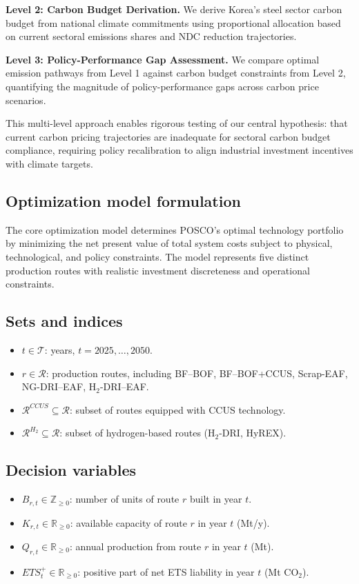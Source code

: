 \documentclass[preprint,5p,authoryear]{elsarticle}
\begin{document}
\textbf{Level 2: Carbon Budget Derivation.} We derive Korea's steel sector carbon budget from national climate commitments using proportional allocation based on current sectoral emissions shares and NDC reduction trajectories.

\textbf{Level 3: Policy-Performance Gap Assessment.} We compare optimal emission pathways from Level 1 against carbon budget constraints from Level 2, quantifying the magnitude of policy-performance gaps across carbon price scenarios.

This multi-level approach enables rigorous testing of our central hypothesis: that current carbon pricing trajectories are inadequate for sectoral carbon budget compliance, requiring policy recalibration to align industrial investment incentives with climate targets.

\subsection{Optimization model formulation}

The core optimization model determines POSCO's optimal technology portfolio by minimizing the net present value of total system costs subject to physical, technological, and policy constraints. The model represents five distinct production routes with realistic investment discreteness and operational constraints.

\subsection{Sets and indices}
\begin{itemize}[leftmargin=*]
    \item $t \in \mathcal{T}$: years, $t = 2025, \dots, 2050$.
    \item $r \in \mathcal{R}$: production routes, including BF--BOF, BF--BOF+CCUS, Scrap-EAF, NG-DRI--EAF, H$_2$-DRI--EAF.
    \item $\mathcal{R}^{CCUS} \subseteq \mathcal{R}$: subset of routes equipped with CCUS technology.
    \item $\mathcal{R}^{H_2} \subseteq \mathcal{R}$: subset of hydrogen-based routes (H$_2$-DRI, HyREX).
\end{itemize}

\subsection{Decision variables}
\begin{itemize}[leftmargin=*]
    \item $B_{r,t} \in \mathbb{Z}_{\ge 0}$: number of units of route $r$ built in year $t$.
    \item $K_{r,t} \in \mathbb{R}_{\ge 0}$: available capacity of route $r$ in year $t$ (Mt/y).
    \item $Q_{r,t} \in \mathbb{R}_{\ge 0}$: annual production from route $r$ in year $t$ (Mt).
    \item $ETS_{t}^{+} \in \mathbb{R}_{\ge 0}$: positive part of net ETS liability in year $t$ (Mt CO$_2$).
\end{itemize}
\end{document}
